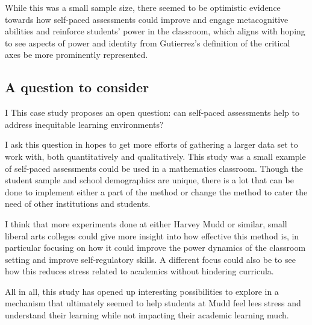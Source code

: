While this was a small sample size, there seemed to be optimistic evidence towards how self-paced assessments could improve and engage metacognitive abilities and reinforce students' power in the classroom, which aligns with hoping to see aspects of power and identity from Gutierrez's definition of the critical axes be more prominently represented.

\subsection{A question to consider}

I This case study proposes an open question: can self-paced assessments help to address inequitable learning environments?

I ask this question in hopes to get more efforts of gathering a larger data set to work with, both quantitatively and qualitatively. This study was a small example of self-paced assessments could be used in a mathematics classroom. Though the student sample and school demographics are unique, there is a lot that can be done to implement either a part of the method or change the method to cater the need of other institutions and students.

I think that more experiments done at either Harvey Mudd or similar, small liberal arts colleges could give more insight into how effective this method is, in particular focusing on how it could improve the power dynamics of the classroom setting and improve self-regulatory skills. A different focus could also be to see how this reduces stress related to academics without hindering curricula.

All in all, this study has opened up interesting possibilities to explore in a mechanism that ultimately seemed to help students at Mudd feel lees stress and understand their learning while not impacting their academic learning much.
